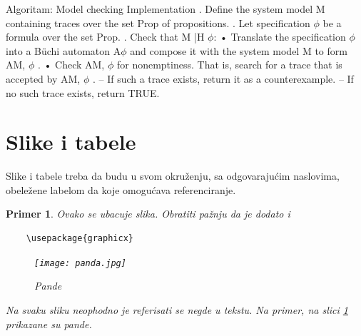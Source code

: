\documentclass[a4paper]{article}
\newtheorem{primer}{Primer}[section]
\begin{document}
Algoritam: \newline
Model checking \newline
Implementation \newline
{}. Define the system model M containing traces over the set Prop of propositions. \newline {}. Let specification $\phi$ be a formula over the set Prop. \newline {}. Check that M |H $\phi$: \newline \newline
• Translate the specification \not$\phi$ into a Büchi automaton A\not$\phi$ and compose it with the
system model M to form AM, \not$\phi$
. \newline \newline
• Check AM, \not$\phi$
for nonemptiness. That is, search for a trace that is accepted by AM, \not$\phi$ \newline \newline
.
– If such a trace exists, return it as a counterexample. \newline \newline
– If no such trace exists, return TRUE. \newline \newline

	\section{Slike i tabele}
	\label{slike_i_tabele}

	Slike i tabele treba da budu u svom okruženju, sa odgovarajućim naslovima, obeležene labelom da koje omogućava referenciranje. 

	\begin{primer} Ovako se ubacuje slika. Obratiti pažnju da je dodato i 
	\begin{verbatim}
	\usepackage{graphicx}
	\end{verbatim}

	\begin{figure}[h!]
	\begin{center}
	\texttt{[image: panda.jpg]}
	\end{center}
	\caption{Pande}
	\label{fig:pande}
	\end{figure}

	Na svaku sliku neophodno je referisati se negde u tekstu. Na primer, na slici \ref{fig:pande} prikazane su pande. 
	\end{primer}
\end{document}
